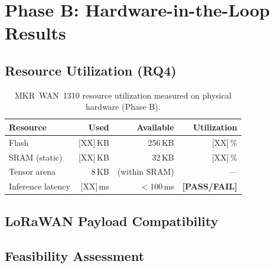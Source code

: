 \section{Phase B: Hardware-in-the-Loop Results}
\label{sec:phase-b-results}

\subsection{Resource Utilization (RQ4)}

\begin{table}[H]
  \centering
  \begin{tabular}{lrrr}
    \toprule
    \textbf{Resource} & \textbf{Used} & \textbf{Available} &
    \textbf{Utilization} \\
    \midrule
    Flash               & [XX]\,KB & 256\,KB       & [XX]\,\%             \\
    SRAM (static)       & [XX]\,KB & 32\,KB        & [XX]\,\%             \\
    Tensor arena        & 8\,KB    & (within SRAM) & ---                  \\
    Inference latency   & [XX]\,ms & ${<}$100\,ms  & \textbf{[PASS/FAIL]} \\
    \bottomrule
  \end{tabular}
  \caption{MKR~WAN~1310 resource utilization measured on physical hardware
    (Phase B).}
  \label{tab:hw-resources}
\end{table}

\subsection{LoRaWAN Payload Compatibility}

\subsection{Feasibility Assessment}


